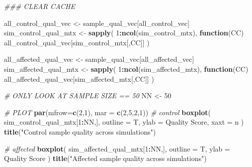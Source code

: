 \documentclass[
]{book}
\newenvironment{Shaded}{\begin{snugshade}}{\end{snugshade}}
\newcommand{\CommentTok}[1]{\textcolor[rgb]{0.56,0.35,0.01}{\textit{#1}}}
\newcommand{\ControlFlowTok}[1]{\textcolor[rgb]{0.13,0.29,0.53}{\textbf{#1}}}
\newcommand{\DataTypeTok}[1]{\textcolor[rgb]{0.13,0.29,0.53}{#1}}
\newcommand{\DecValTok}[1]{\textcolor[rgb]{0.00,0.00,0.81}{#1}}
\newcommand{\KeywordTok}[1]{\textcolor[rgb]{0.13,0.29,0.53}{\textbf{#1}}}
\newcommand{\NormalTok}[1]{#1}
\newcommand{\OperatorTok}[1]{\textcolor[rgb]{0.81,0.36,0.00}{\textbf{#1}}}
\newcommand{\StringTok}[1]{\textcolor[rgb]{0.31,0.60,0.02}{#1}}
\begin{document}
\begin{Shaded}
\begin{Highlighting}[]
\CommentTok{\#\#\# CLEAR CACHE}

\NormalTok{all\_control\_qual\_vec <{-}}\StringTok{ }\NormalTok{sample\_qual\_vec[all\_control\_vec]}
\NormalTok{sim\_control\_qual\_mtx <{-}}\StringTok{ }\KeywordTok{sapply}\NormalTok{(}
  \DecValTok{1}\OperatorTok{:}\KeywordTok{ncol}\NormalTok{(sim\_control\_mtx), }
  \ControlFlowTok{function}\NormalTok{(CC) all\_control\_qual\_vec[sim\_control\_mtx[,CC]]}
\NormalTok{ )}

\NormalTok{all\_affected\_qual\_vec <{-}}\StringTok{ }\NormalTok{sample\_qual\_vec[all\_affected\_vec]}
\NormalTok{sim\_affected\_qual\_mtx <{-}}\StringTok{ }\KeywordTok{sapply}\NormalTok{(}
  \DecValTok{1}\OperatorTok{:}\KeywordTok{ncol}\NormalTok{(sim\_affected\_mtx),  }
  \ControlFlowTok{function}\NormalTok{(CC) all\_affected\_qual\_vec[sim\_affected\_mtx[,CC]]}
\NormalTok{ )}

\CommentTok{\# ONLY LOOK AT SAMPLE SIZE == 50}
\NormalTok{NN <{-}}\StringTok{ }\DecValTok{50}

\CommentTok{\# PLOT}
\KeywordTok{par}\NormalTok{(}\DataTypeTok{mfrow=}\KeywordTok{c}\NormalTok{(}\DecValTok{2}\NormalTok{,}\DecValTok{1}\NormalTok{), }\DataTypeTok{mar =} \KeywordTok{c}\NormalTok{(}\DecValTok{2}\NormalTok{,}\DecValTok{5}\NormalTok{,}\DecValTok{2}\NormalTok{,}\DecValTok{1}\NormalTok{))}
\CommentTok{\# control}
\KeywordTok{boxplot}\NormalTok{(}
\NormalTok{  sim\_control\_qual\_mtx[}\DecValTok{1}\OperatorTok{:}\NormalTok{NN,],}
  \DataTypeTok{outline =}\NormalTok{ T, }
  \DataTypeTok{ylab =} \StringTok{\textquotesingle{}Quality Score\textquotesingle{}}\NormalTok{,}
  \DataTypeTok{xaxt =} \StringTok{\textquotesingle{}n\textquotesingle{}}
\NormalTok{)}
\KeywordTok{title}\NormalTok{(}\StringTok{"Control sample quality across simulations"}\NormalTok{)}

\CommentTok{\# affected}
\KeywordTok{boxplot}\NormalTok{(}
\NormalTok{  sim\_affected\_qual\_mtx[}\DecValTok{1}\OperatorTok{:}\NormalTok{NN,],}
  \DataTypeTok{outline =}\NormalTok{ T, }
  \DataTypeTok{ylab =} \StringTok{\textquotesingle{}Quality Score\textquotesingle{}}
\NormalTok{)}
\KeywordTok{title}\NormalTok{(}\StringTok{"Affected sample quality across simulations"}\NormalTok{)}
\end{Highlighting}
\end{Shaded}
\end{document}
